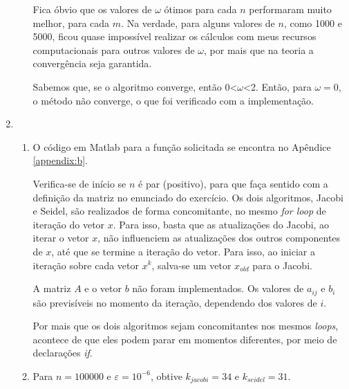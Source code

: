 \documentclass{article}
\begin{document}
\begin{enumerate}
\begin{enumerate}
                    Fica óbvio que os valores de $\omega$ ótimos para cada $n$ performaram muito melhor, para cada $m$.
                    Na verdade, para alguns valores de $n$, como 1000 e 5000, ficou quase impossível realizar os cálculos com meus recursos computacionais para outros valores de $\omega$,
                    por mais que na teoria a convergência seja garantida.
                    
                    Sabemos que, se o algoritmo converge, então 0<$\omega$<2. Então, para $\omega=0$, o
                    método não converge, o que foi verificado com a implementação.
                    
            \end{enumerate}
            
        \item \begin{enumerate}
                \item O código em Matlab para a função solicitada se encontra no Apêndice \ref{appendix:b}.
                
                    Verifica-se de início se $n$ é par (positivo), para que faça sentido com a definição da matriz
                    no enunciado do exercício. Os dois algoritmos, Jacobi e Seidel, são realizados de forma concomitante,
                    no mesmo \textit{for loop} de iteração do vetor $x$. Para isso, basta que as atualizações do Jacobi, ao iterar o vetor $x$, não influenciem as atualizações
                    dos outros componentes de $x$, até que se termine a iteração do vetor. Para isso, ao iniciar a iteração sobre cada vetor $x^{k}$, salva-se um vetor
                    $x_{old}$ para o Jacobi.

                    A matriz $A$ e o vetor $b$ não foram implementados. Os valores de $a_{ij}$ e $b_i$ são previsíveis no momento
                    da iteração, dependendo dos valores de $i$.

                    Por mais que os dois algoritmos sejam concomitantes nos mesmos \textit{loops}, acontece de que eles podem parar em momentos diferentes,
                    por meio de declarações \textit{if}.

                \item Para $n=100000$ e $\varepsilon=10^{-6}$, obtive $k_{jacobi}=34$ e $k_{seidel}=31$.
            \end{enumerate}

    \end{enumerate}
\end{document}
